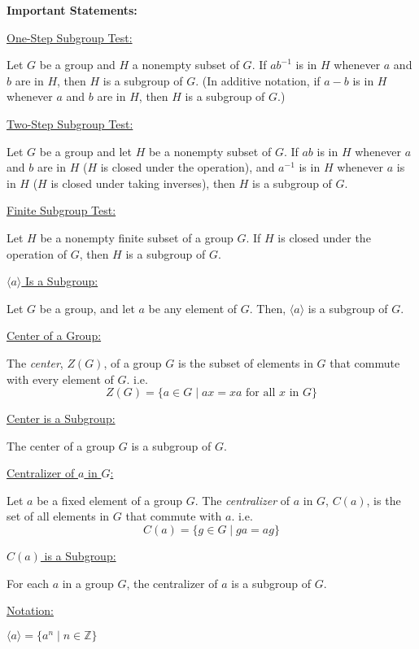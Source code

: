 \documentclass[11pt,largemargins]{homework}
\begin{document}
\maketitle

\textbf{\large{Important Statements:}}

\underline{One-Step Subgroup Test:}

\quad Let $G$ be a group and $H$ a nonempty subset of $G$. If $ab^{-1}$ is in $H$ whenever $a$ and $b$ are in $H$,
then $H$ is a subgroup of $G$. (In additive notation, if $a-b$ is in $H$ whenever $a$ and $b$ are in $H$, then $H$ is 
a subgroup of $G$.)

\underline{Two-Step Subgroup Test:}

\quad Let $G$ be a group and let $H$ be a nonempty subset of $G$. If $ab$ is in $H$ whenever $a$ and $b$ are in $H$
($H$ is closed under the operation), and $a^{-1}$ is in $H$ whenever $a$ is in $H$ ($H$ is closed under taking inverses),
then $H$ is a subgroup of $G$.


\underline{Finite Subgroup Test:}

\quad Let $H$ be a nonempty finite subset of a group $G$. If $H$ is closed under the operation of $G$, then 
$H$ is a subgroup of $G$.

\underline{$\langle a \rangle$ Is a Subgroup:}

\quad Let $G$ be a group, and let $a$ be any element of $G$. Then, $\langle a \rangle$ is a subgroup of $G$.

\underline{Center of a Group:}

\quad The \textit{center}, $Z(G)$, of a group $G$ is the subset of elements in $G$ that commute with every 
element of $G$. i.e.
$$Z(G) = \{a \in G \;|\; ax=xa \text{ for all } x \text{ in } G\}$$

\underline{Center is a Subgroup:}

\quad The center of a group $G$ is a subgroup of $G$.

\underline{Centralizer of $a$ in $G$:}

\quad Let $a$ be a fixed element of a group $G$. The \textit{centralizer} of $a$ in $G$, $C(a)$, is the set of 
all elements in $G$ that commute with $a$. i.e.
$$C(a) = \{ g \in G \;|\; ga=ag \}$$

\underline{$C(a)$ is a Subgroup:}

\quad For each $a$ in a group $G$, the centralizer of $a$ is a subgroup of $G$.

\underline{Notation:}

\quad $\langle a \rangle = \{a^n \;|\; n\in \mathbb{Z}\}$
\end{document}

